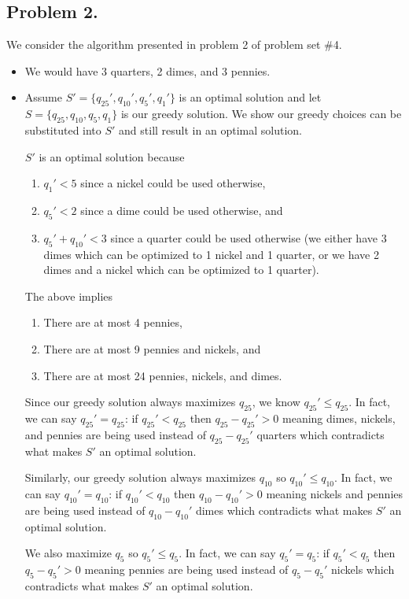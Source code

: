 \documentclass[11pt, letterpaper, titlepage]{article}
\begin{document}
\subsection*{Problem 2.}
We consider the algorithm presented in problem 2 of problem set \#4.
\begin{itemize}
    \item We would have 3 quarters, 2 dimes, and 3 pennies.
    
    \item Assume $S' = \{ q_{25}', q_{10}', q_{5}', q_{1}' \}$ is an optimal solution and let $S = \{ q_{25}, q_{10}, q_{5}, q_{1} \}$ is our greedy solution. We show our greedy choices can be substituted into $S'$ and still result in an optimal solution. 
    
    $S'$ is an optimal solution because 
    \begin{enumerate}
        \item $q_{1}' < 5$ since a nickel could be used otherwise,
        \item $q_{5}' < 2$ since a dime could be used otherwise, and
        \item $q_{5}' + q_{10}' < 3$ since a quarter could be used otherwise (we either have 3 dimes which can be optimized to 1 nickel and 1 quarter, or we have 2 dimes and a nickel which can be optimized to 1 quarter).
    \end{enumerate}
    The above implies
    \begin{enumerate}
        \item There are at most 4 pennies,
        \item There are at most 9 pennies and nickels, and
        \item There are at most 24 pennies, nickels, and dimes.
    \end{enumerate}
    Since our greedy solution always maximizes $q_{25}$, we know $q_{25}' \leq q_{25}$. In fact, we can say $q_{25}' = q_{25}$: if $q_{25}' < q_{25}$ then $q_{25} - q_{25}' > 0$ meaning dimes, nickels, and pennies are being used instead of $q_{25} - q_{25}'$ quarters which contradicts what makes $S'$ an optimal solution. 

    Similarly, our greedy solution always maximizes $q_{10}$ so $q_{10}' \leq q_{10}$. In fact, we can say $q_{10}' = q_{10}$: if $q_{10}' < q_{10}$ then $q_{10} - q_{10}' > 0$ meaning nickels and pennies are being used instead of $q_{10} - q_{10}'$ dimes which contradicts what makes $S'$ an optimal solution. 

    We also maximize $q_{5}$ so $q_{5}' \leq q_{5}$. In fact, we can say $q_{5}' = q_{5}$: if $q_{5}' < q_{5}$ then $q_{5} - q_{5}' > 0$ meaning pennies are being used instead of $q_{5} - q_{5}'$ nickels which contradicts what makes $S'$ an optimal solution.


\end{itemize}
\end{document}

